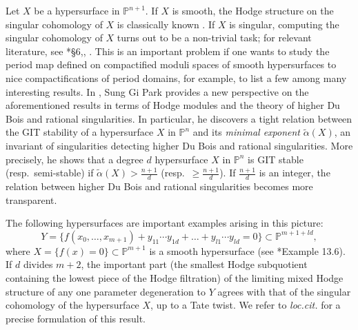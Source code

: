 \documentclass[letterpaper,11pt]{amsart}
\theoremstyle{plain}
\theoremstyle{definition}
\theoremstyle{remark}
\newcommand{\PP}{\mathbb{P}}
\begin{document}
    Let $X$ be a hypersurface in $\PP^{n+1}$. If $X$ is smooth, the Hodge structure on the singular cohomology of $X$ is classically known \cite{Carlson--Griffiths}. If $X$ is singular, computing the singular cohomology of $X$ turns out to be a non-trivial task; for relevant literature, see \cite{Dimca}*{\S6},\cite{Dimca-Saito}, \cite{Dimca-Saito-Wotzlaw}. This is an important problem if one wants to study the period map defined on compactified moduli spaces of smooth hypersurfaces to nice compactifications of period domains, for example, \cite{Shah-degree-2-K3,Shah-degree-4-K3,Engel-Alexeev,Allcock-Carlson-Toledo,Laza:4-fold-period, Looijenga-cubic-fourfold} to list a few among many interesting results. In \cite{park2025git}, Sung Gi Park provides a new perspective on the aforementioned results in terms of Hodge modules and the theory of higher Du Bois and rational singularities. In particular, he discovers a tight relation between the GIT stability of a hypersurface $X$ in $\PP^{n}$ and its \textit{minimal exponent} $\widetilde{\alpha}(X)$, an invariant of singularities detecting higher Du Bois and rational singularities. More precisely, he shows that a degree $d$ hypersurface $X$ in $\PP^{n}$ is GIT stable (resp.\ semi-stable) if $\widetilde{\alpha}(X) > \frac{n+1}{d}$ (resp.\ $\geq \frac{n+1}{d}$). If $\frac{n+1}{d}$ is an integer, the relation between higher Du Bois and rational singularities becomes more transparent.
    
    The following hypersurfaces are important examples arising in this picture:
    $$ Y = \{ f(x_{0},\ldots, x_{m+1}) + y_{11}\cdots y_{1d} + \ldots + y_{l1} \cdots y_{ld} = 0 \} \subset \PP^{m+1+ld}, $$
    where $X = \{ f(x) = 0 \} \subset \PP^{m+1}$ is a smooth hypersurface (see \cite{park2025git}*{Example 13.6}). If $d$ divides $m+2$, the important part (the smallest Hodge subquotient containing the lowest piece of the Hodge filtration) of the limiting mixed Hodge structure of any one parameter degeneration to $Y$ agrees with that of the singular cohomology of the hypersurface $X$, up to a Tate twist. We refer to \textit{loc.cit.} for a precise formulation of this result.
\end{document}

